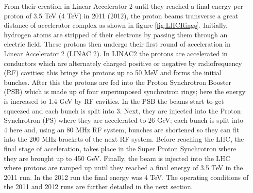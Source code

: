 From their creation in Linear Accelerator 2 until they reached
a final energy per proton of 3.5 TeV (4 TeV) in 2011 (2012),
the proton beams transverse a great distance of accelerator complex %
as shown in figure \ref{fig:LHCRings}.%
Initially, hydrogen atoms are stripped of their electrons by passing them
through an electric field. These protons
then undergo their first round of acceleration in Linear Accelerator 2 (LINAC 2).
In LINAC2 the protons are accelerated in conductors which
are alternately charged positive or negative by radiofrequency (RF) cavities;
this brings the protons up to 50 MeV and forms the initial bunches. 
After this the protons are
fed into the Proton Synchrotron Booster (PSB) which is made up 
of four superimposed synchrotron rings; here the energy
is increased to 1.4 GeV by RF cavities. In
the PSB the beams start to get squeezed and each bunch is 
split into 3. 
Next, they are injected into the Proton
Synchrotron (PS) where they are accelerated to 26 GeV; each
bunch is split into 4 here and, using an 80 MHz RF system,
bunches are shortened so they can fit into the 200 MHz brackets
of the next RF system. Before reaching the LHC, the final
stage of acceleration, takes place in the
Super Proton Synchrotron where they are brought up to 450 GeV.
Finally, the beam is injected into the LHC where protons are ramped
up until they reached a final energy of 3.5 TeV 
in the 2011 run. In the 2012 run the final energy was 4 TeV. 
The operating conditions of the 2011 and 2012 runs are further
detailed in the next section.

